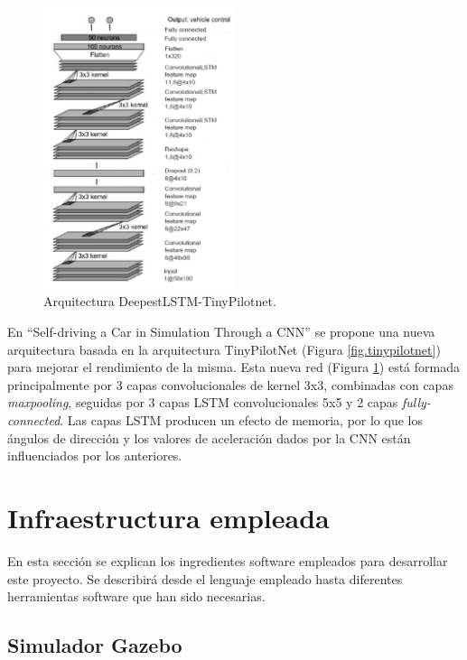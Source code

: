 \begin{figure}
\begin{center}
	\includegraphics[width=0.5\textwidth]{figures/Estado_arte/deepestlstm.png}
   \caption{Arquitectura DeepestLSTM-TinyPilotnet.}
	\label{fig.deepestlstm}
\end{center}
\end{figure}

En ``Self-driving  a  Car  in  Simulation  Through  a  CNN'' \cite{self-driving} se propone una nueva arquitectura basada en la arquitectura TinyPilotNet (Figura \ref{fig.tinypilotnet}) para mejorar el rendimiento de la misma. Esta nueva red (Figura \ref{fig.deepestlstm}) está formada principalmente por 3 capas convolucionales de kernel 3x3, combinadas con capas \textit{maxpooling}, seguidas por 3 capas LSTM convolucionales 5x5 y 2 capas \textit{fully-connected}. Las capas LSTM producen un efecto de memoria, por lo que los ángulos de dirección y los valores de aceleración dados por la CNN están influenciados por los anteriores. \\


\section{Infraestructura empleada}

En esta sección se explican los ingredientes software empleados para desarrollar este proyecto. Se describirá desde el lenguaje empleado hasta diferentes herramientas software que han sido necesarias.

\subsection{Simulador Gazebo}

